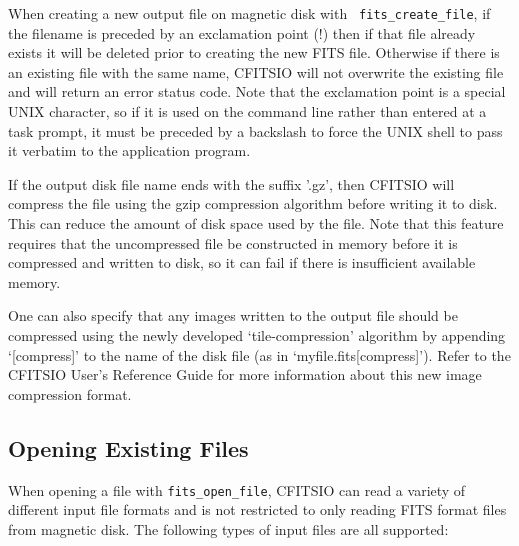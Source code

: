\documentclass[11pt]{article}
\begin{document}
When creating a new output file on magnetic disk  with {\tt
fits\_create\_file}, if the filename is preceded by an exclamation
point (!) then if that file already exists it will be deleted prior to
creating the new FITS file.  Otherwise if there is an existing file
with the same name, CFITSIO will not overwrite the existing file and
will return an error status code.  Note  that the exclamation point is
a special UNIX character, so if it is used on the command line rather
than entered at a task prompt, it must be preceded by a backslash to
force the UNIX shell to pass it verbatim to the application program.

If the output disk file name ends with the suffix '.gz', then CFITSIO
will compress the file using the gzip compression algorithm before
writing it to disk.  This can reduce the amount of disk space used by
the file.  Note that this feature requires that the uncompressed file
be constructed in memory before it is compressed and written to disk,
so it can fail if there is insufficient available memory.

One can also specify that any images written to the output file should
be compressed using the newly developed `tile-compression' algorithm by
appending `[compress]' to the name of the disk file (as in
`myfile.fits[compress]').   Refer to the CFITSIO User's Reference Guide
for more information about this new image compression format.

\subsection{Opening Existing Files}

When opening a file with {\tt fits\_open\_file}, CFITSIO can read a
variety of different input file formats and is not restricted to only
reading FITS format files from magnetic disk. The following types of
input files are all supported:
\end{document}
